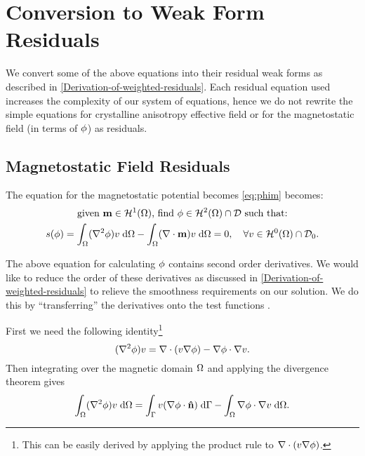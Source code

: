 \section{Conversion to Weak Form Residuals}

We convert some of the above equations into their residual weak forms as described in \autoref{Derivation-of-weighted-residuals}.
Each residual equation used increases the complexity of our system of equations, hence we do not rewrite the simple equations for crystalline anisotropy effective field or for the magnetostatic field (in terms of $\phi$) as residuals.


\subsection{Magnetostatic Field Residuals}
\label{sec:magn-field-resid}

The equation for the magnetostatic potential becomes \eqref{eq:phim} becomes:
\begin{gather}
  \text{given $\mathbf{m} \in \mathcal{H}^1(\Omega)$, find $\phi \in \mathcal{H}^2(\Omega) \cap \mathcal{D}$ such that:} \notag \\
  s(\phi) = \int_\Omega (\nabla^2 \phi) v  {\; \text{d}} \Omega
  - \int_\Omega (\nabla \cdot \mathbf{m}) v {\; \text{d}} \Omega = 0,
  \quad \forall v \in \mathcal{H}^0(\Omega) \cap \mathcal{D}_0. \label{eqn:phires1}
\end{gather}

The above equation for calculating $\phi$ contains second order derivatives.
We would like to reduce the order of these derivatives as discussed in \autoref{Derivation-of-weighted-residuals} to relieve the smoothness requirements on our solution.
We do this by ``transferring'' the derivatives onto the test functions \cite{HowardElmanDavidSilvester2006}.

First we need the following identity\footnote{This can be easily derived by applying the product rule to $\nabla \cdot (v \nabla \phi)$.}
\begin{equation}
  (\nabla^2 \phi) v =
  \nabla \cdot (v \nabla \phi)
  - \nabla \phi \cdot \nabla v.
  \label{eq:20}
\end{equation}
Then integrating over the magnetic domain $\Omega$ and applying the divergence theorem gives
\begin{equation}
  \int_\Omega (\nabla^2 \phi) v {\; \text{d}} \Omega =
  \int_{{\Gamma}} v (\nabla \phi \cdot \mathbf{\hat{n}}) {\; \text{d}} {\Gamma}
  - \int_\Omega \nabla \phi \cdot \nabla v {\; \text{d}} \Omega.
  \label{eqn:identitygauss}
\end{equation}

